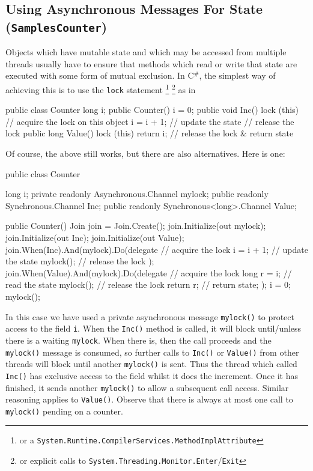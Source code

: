 \documentclass{article}
\newcommand{\csharp}{\texorpdfstring{\mbox{C$^\#$}}{C\#}}
\newcommand{\sample}[1]{\texorpdfstring{{(\texttt{Samples{\symbol{92}}#1})}}{}}
\begin{document}
\subsection{Using Asynchronous Messages For State \sample{Counter}}
Objects which have mutable state and which may be accessed from
multiple threads usually have to ensure that methods which read or
write that state are executed with some form of mutual exclusion. In \csharp, the simplest way of achieving this is to use the \verb|lock| statement
\footnote{or a \texttt{System.Runtime.CompilerServices.MethodImplAttribute}}
\footnote{or explicit calls to \texttt{System.Threading.Monitor.Enter}/\texttt{Exit}} as in
\begin{lstcsharp}
  public class Counter {
    long i;
    public Counter() {
      i = 0;
    }
    public void Inc() {
      lock (this) {        // acquire the lock on this object
        i = i + 1;         // update the state
      }                    // release the lock
    }
    public long Value() {
      lock (this) {
        return i;          // release the lock & return state
      }
    }
  }
\end{lstcsharp}

Of course, the above still works, but there are also alternatives. Here is one:

\begin{lstcsharp}
public class Counter {
  long i;
  private readonly Asynchronous.Channel mylock;
  public readonly Synchronous.Channel Inc;
  public readonly Synchronous<long>.Channel Value;

  public Counter() {
    Join join = Join.Create();
    join.Initialize(out mylock);
    join.Initialize(out Inc);
    join.Initialize(out Value);
    join.When(Inc).And(mylock).Do(delegate 
    { // acquire the lock
        i = i + 1;  // update the state
        mylock();  // release the lock
    });
    join.When(Value).And(mylock).Do(delegate
    { // acquire the lock
        long r = i;  // read the state
        mylock();    // release the lock
        return r;    // return state;
    });
    i = 0;
    mylock();
  }
}
\end{lstcsharp}


In this case we have used a private asynchronous message
\verb|mylock()| to protect access to the field \verb|i|. When the
\verb|Inc()| method is called, it will block until/unless there is a
waiting \verb|mylock|. When there is, then the call proceeds and the
\verb|mylock()| message is consumed, so further calls to \verb|Inc()|
or \verb|Value()| from other threads will block until another
\verb|mylock()| is sent. Thus the thread which called \verb|Inc()| has
exclusive access to the field whilst it does the increment. Once it
has finished, it sends another \verb|mylock()| to allow a subsequent
call access. Similar reasoning applies to \verb|Value()|. Observe that
there is always at most one call to \verb|mylock()| pending on a
counter.
\end{document}
